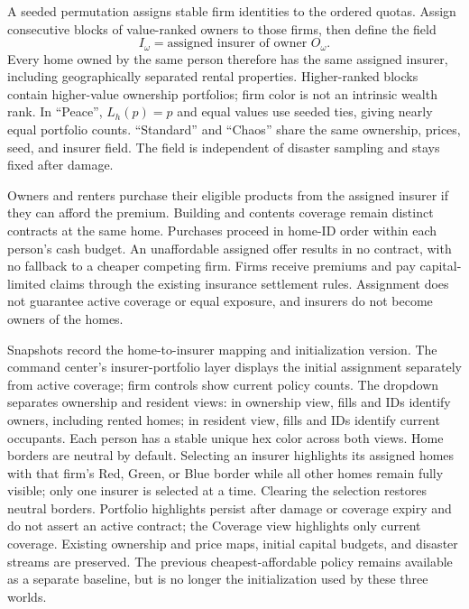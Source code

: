 \documentclass[10pt]{article}
\begin{document}
A seeded permutation assigns stable firm identities to the ordered quotas. Assign consecutive blocks of value-ranked owners to those firms, then define the field
\begin{equation}
 I_\omega=\text{assigned insurer of owner }O_\omega.
\end{equation}
Every home owned by the same person therefore has the same assigned insurer, including geographically separated rental properties. Higher-ranked blocks contain higher-value ownership portfolios; firm color is not an intrinsic wealth rank. In ``Peace'', $L_h(p)=p$ and equal values use seeded ties, giving nearly equal portfolio counts. ``Standard'' and ``Chaos'' share the same ownership, prices, seed, and insurer field. The field is independent of disaster sampling and stays fixed after damage.

Owners and renters purchase their eligible products from the assigned insurer if they can afford the premium. Building and contents coverage remain distinct contracts at the same home. Purchases proceed in home-ID order within each person's cash budget. An unaffordable assigned offer results in no contract, with no fallback to a cheaper competing firm. Firms receive premiums and pay capital-limited claims through the existing insurance settlement rules. Assignment does not guarantee active coverage or equal exposure, and insurers do not become owners of the homes.

Snapshots record the home-to-insurer mapping and initialization version. The command center's insurer-portfolio layer displays the initial assignment separately from active coverage; firm controls show current policy counts. The dropdown separates ownership and resident views: in ownership view, fills and IDs identify owners, including rented homes; in resident view, fills and IDs identify current occupants. Each person has a stable unique hex color across both views. Home borders are neutral by default. Selecting an insurer highlights its assigned homes with that firm's Red, Green, or Blue border while all other homes remain fully visible; only one insurer is selected at a time. Clearing the selection restores neutral borders. Portfolio highlights persist after damage or coverage expiry and do not assert an active contract; the Coverage view highlights only current coverage. Existing ownership and price maps, initial capital budgets, and disaster streams are preserved. The previous cheapest-affordable policy remains available as a separate baseline, but is no longer the initialization used by these three worlds.
\end{document}
